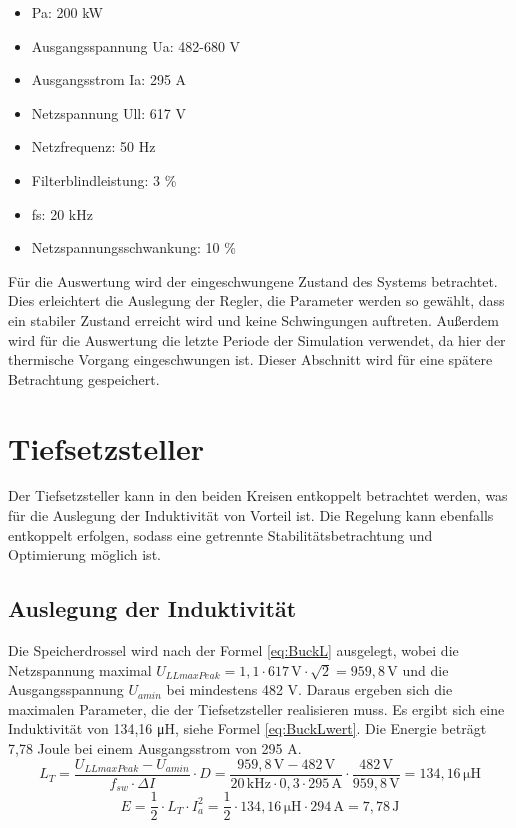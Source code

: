 \begin{itemize}
\item \gls{Pa}: 200 kW
\item Ausgangsspannung \gls{Ua}: 482-680 V
\item Ausgangsstrom \gls{Ia}: 	295 A
\item Netzspannung \gls{Ull}:		617 V
\item Netzfrequenz:		50 Hz
\item Filterblindleistung: 3 \%
\item \gls{fs}: 20 kHz
\item Netzspannungsschwankung: 10 \%
\end{itemize}

Für die Auswertung wird der eingeschwungene Zustand des Systems betrachtet. Dies erleichtert die Auslegung der Regler, die Parameter werden so gewählt, dass ein stabiler Zustand erreicht wird und keine Schwingungen auftreten. Außerdem wird für die Auswertung die letzte Periode der Simulation verwendet, da hier der thermische Vorgang eingeschwungen ist. Dieser Abschnitt wird für eine spätere Betrachtung gespeichert.

\section{Tiefsetzsteller}
Der Tiefsetzsteller kann in den beiden Kreisen entkoppelt betrachtet werden, was für die Auslegung der Induktivität von Vorteil ist. Die Regelung kann ebenfalls entkoppelt erfolgen, sodass eine getrennte Stabilitätsbetrachtung und Optimierung möglich ist. 
	\subsection{Auslegung der Induktivität}
	Die Speicherdrossel wird nach der Formel \ref{eq:BuckL} ausgelegt, wobei die Netzspannung maximal $U_{LLmaxPeak}=1,1 \cdot 617\, \si{\V} \cdot \sqrt{2}=959,8\, \si{\V}$ und die Ausgangsspannung $U_{amin}$ bei mindestens 482 \si{\V}. Daraus ergeben sich die maximalen Parameter, die der Tiefsetzsteller realisieren muss. Es ergibt sich eine Induktivität von 134,16 \si{\micro \henry}, siehe Formel \ref{eq:BuckLwert}. Die Energie beträgt 7,78 Joule bei einem Ausgangsstrom von 295 A. 
	\begin{equation}
	\label{eq:BuckLwert}
	L_{T}= \dfrac{U_{LLmaxPeak}-U_{amin}}{f_{sw} \cdot \Delta I} \cdot D = \dfrac{959,8\,\si{\V} - 482\, \si{\V}}{20\, \si{\kilo \hertz}\cdot 0,3 \cdot 295\, \si{\ampere}} \cdot \dfrac{482\, \si{\V}}{959,8\, \si{\V}}= 134,16 \,\si{\micro \henry} 
	\end{equation}
	\begin{equation}
		E=\dfrac{1}{2} \cdot L_{T} \cdot I_{a}^{2} = \dfrac{1}{2} \cdot 134,16\, \si{\micro \henry}  \cdot 294\, \si{\ampere} = 7,78\, \si{\joule}
	\end{equation}
